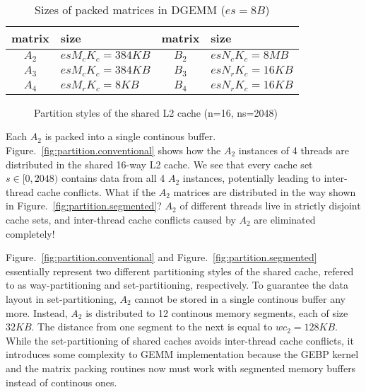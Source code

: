 \begin{table}
  \centering
  \caption{Sizes of packed matrices in DGEMM ($es = 8B$)}
  \label{tab:msizes}
  \begin{tabular}{cl|cl}
    \toprule
    matrix & size & matrix & size \\
    \midrule
    $A_2$ & $es M_c K_c = 384KB$ & $B_2$ & $es N_c K_c = 8MB$ \\
    $A_3$ & $es M_c K_c = 384KB$ & $B_3$ & $es N_r K_c = 16KB$ \\
    $A_4$ & $es M_r K_c = 8KB$   & $B_4$ & $es N_r K_c = 16KB$ \\
    \bottomrule
  \end{tabular}
\end{table}

\begin{figure}
  \centering
  \caption{Partition styles of the shared L2 cache (n=16, ns=2048)}
  \label{fig:partition}
\end{figure}

Each $A_2$ is packed into a single continous buffer.
Figure.~\ref{fig:partition.conventional} shows how the
$A_2$ instances of 4 threads are distributed in the shared 16-way L2 cache.
We see that every cache set $s \in [0,2048)$ contains
data from all 4 $A_2$ instances,
potentially leading to inter-thread cache conflicts.
What if the $A_2$ matrices are distributed in the way shown in
Figure.~\ref{fig:partition.segmented}?
$A_2$ of different threads live in strictly disjoint cache sets,
and inter-thread cache conflicts caused by $A_2$ are eliminated completely!

Figure.~\ref{fig:partition.conventional} and Figure.~\ref{fig:partition.segmented}
essentially represent two different partitioning styles of the shared cache,
refered to as way-partitioning and set-partitioning, respectively.
To guarantee the data layout in set-partitioning,
$A_2$ cannot be stored in a single continous buffer any more.
Instead, $A_2$ is distributed to 12 continous memory segments, each of size $32KB$.
The distance from one segment to the next is equal to $wc_2=128KB$.
While the set-partitioning of shared caches avoids inter-thread cache conflicts,
it introduces some complexity to GEMM implementation
because the GEBP kernel and the matrix packing routines
now must work with segmented memory buffers instead of continous ones.

